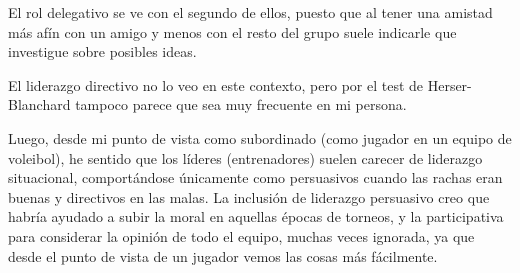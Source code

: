El rol delegativo se ve con el segundo de ellos, puesto que al tener una amistad más afín con un amigo y menos con el resto del grupo suele indicarle que investigue sobre posibles ideas.

El liderazgo directivo no lo veo en este contexto, pero por el test de Herser-Blanchard tampoco parece que sea muy frecuente en mi persona.

\vspace{\baselineskip}

Luego, desde mi punto de vista como subordinado (como jugador en un equipo de voleibol), he sentido que los líderes (entrenadores) suelen carecer de liderazgo situacional, comportándose únicamente como persuasivos cuando las rachas eran buenas y directivos en las malas. La inclusión de liderazgo persuasivo creo que habría ayudado a subir la moral en aquellas épocas de torneos, y la participativa para considerar la opinión de todo el equipo, muchas veces ignorada, ya que desde el punto de vista de un jugador vemos las cosas más fácilmente.


